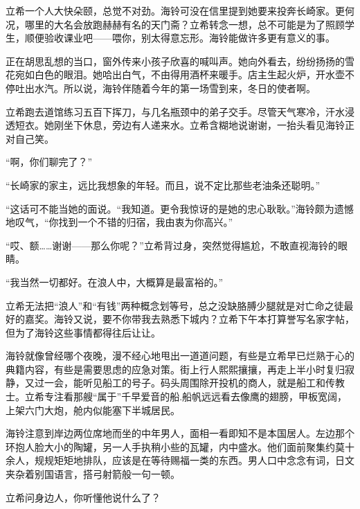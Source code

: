 \documentclass{article}
\begin{document}
立希一个人大快朵颐，总觉不对劲。海铃可没在信里提到她要来投奔长崎家。更何况，哪里的大名会放跑赫赫有名的天门斋？立希转念一想，总不可能是为了照顾学生，顺便验收课业吧——喂你，别太得意忘形。海铃能做许多更有意义的事。



正在胡思乱想的当口，窗外传来小孩子欣喜的喊叫声。她向外看去，纷纷扬扬的雪花宛如白色的眼泪。她哈出白气，不由得用酒杯来暖手。店主生起火炉，开水壶不停吐出水汽。所以说，海铃伴随着今年的第一场雪到来，冬日的使者啊。



立希跑去道馆练习五百下挥刀，与几名瓶颈中的弟子交手。尽管天气寒冷，汗水浸透短衣。她刚坐下休息，旁边有人递来水。立希含糊地说谢谢，一抬头看见海铃正对自己笑。



“啊，你们聊完了？”



“长崎家的家主，远比我想象的年轻。而且，说不定比那些老油条还聪明。”



“这话可不能当她的面说。“我知道。更令我惊讶的是她的忠心耿耿。”海铃颇为遗憾地叹气，“你找到一个不错的归宿，我由衷为你高兴。”



“哎、额……谢谢——那么你呢？”立希背过身，突然觉得尴尬，不敢直视海铃的眼睛。



“我当然一切都好。在浪人中，大概算是最富裕的。”



立希无法把“浪人”和“有钱”两种概念划等号，总之没缺胳膊少腿就是对亡命之徒最好的嘉奖。海铃又说，要不你带我去熟悉下城内？立希下午本打算誉写名家字帖，但为了海铃这些事情都得往后让让。



海铃就像曾经哪个夜晚，漫不经心地甩出一道道问题，有些是立希早已烂熟于心的典籍内容，有些是需要思虑的应急对策。街上行人熙熙攘攘，再走上半小时复归寂静，又过一会，能听见船工的号子。码头周围除开投机的商人，就是船工和传教士。立希专注看那艘“属于”千早爱音的船.船帆远远看去像鹰的翅膀，甲板宽阔，上架六门大炮，舱内似能塞下半城居民。



海铃注意到岸边两位席地而坐的中年男人，面相一看即知不是本国居人。左边那个环抱人脸大小的陶罐，另一人手执稍小些的瓦罐，内中盛水。他们面前聚集约莫十余人，规规矩矩地排队，应该是在等待赐福一类的东西。男人口中念念有词，日文夹杂着别国语言，搭弓射箭般一句一顿。



立希问身边人，你听懂他说什么了？
\end{document}
